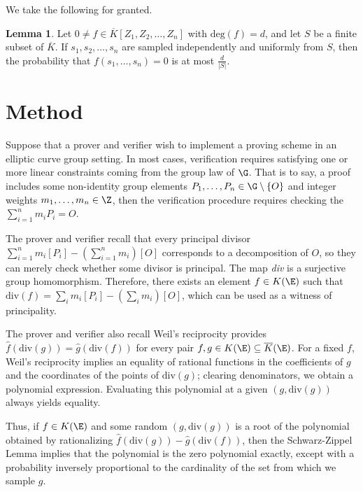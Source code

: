 \documentclass[11pt,letterpaper]{article}
\theoremstyle{definition}
\newtheorem{lemm}{Lemma}[section]
\newcommand{\6}{\mathbf}
\newcommand{\7}{\mathcal}
\begin{document}
We take the following for granted.

\begin{lemm}
Let $0 \neq f \in \overline{K}[Z_1, Z_2, \ldots, Z_n]$ with $\text{deg}(f) = d$, and let $S$ be a finite subset of $\overline{K}$. If $s_1, s_2, \ldots, s_n$ are sampled independently and uniformly from $S$, then the probability that $f(s_1, \ldots, s_n)=0$ is at most $\frac{d}{\left|S\right|}$.
\end{lemm}



\section{Method}

Suppose that a prover and verifier wish to implement a proving scheme in an elliptic curve group setting. In most cases, verification requires satisfying one or more linear constraints coming from the group law of $\G$. That is to say, a proof includes some non-identity group elements $P_1, \ldots, P_n \in \G \setminus \left\{O\right\}$ and integer weights $m_1, \ldots, m_n \in \Z$, then the verification procedure requires checking the $\sum_{i=1}^{n} m_i P_i = O$.

The prover and verifier recall that every principal divisor $\sum_{i=1}^{n} m_i [P_i] - (\sum_{i=1}^{n} m_i)[O]$ corresponds to a decomposition of $O$, so they can merely check whether some divisor  is principal.
The map \textit{div} is a surjective group homomorphism. Therefore, there exists an element $f \in K(\E)$ such that $\text{div}(f) = \sum_i m_i [P_i] - \left(\sum_i m_i\right)[O]$, which can be used as a witness of principality.


The prover and verifier also recall Weil's reciprocity provides $\widehat{f}(\text{div}(g)) = \widehat{g}(\text{div}(f))$ for every pair $f, g \in K(\E) \subseteq \overline{K}(\E)$. For a fixed $f$, Weil's reciprocity implies an equality of rational functions in the coefficients of $g$ and the coordinates of the points of $\text{div}(g)$; clearing denominators, we obtain a polynomial expression. Evaluating this polynomial at a given $(g, \text{div}(g))$ always yields equality. 

Thus, if $f \in K(\E)$ and some random $(g, \text{div}(g))$ is a root of the polynomial obtained by rationalizing $\widehat{f}(\text{div}(g)) - \widehat{g}(\text{div}(f))$, then the Schwarz-Zippel Lemma implies that the polynomial is the zero polynomial exactly, except with a probability inversely proportional to the cardinality of the set from which we sample $g$.
\end{document}
